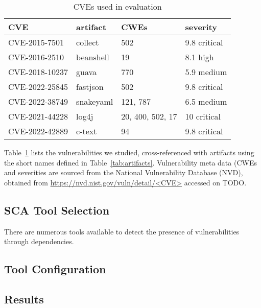 \begin{table}
	\begin{tabular}{|p{3cm}p{2cm}p{2.4cm}p{2.2cm}|}
		\hline
		CVE & artifact & CWEs  & severity  \\ 
		\hline
		CVE-2015-7501 & collect &  502  &  9.8 critical \\
		CVE-2016-2510 & beanshell & 19 & 8.1 high \\ 
		CVE-2018-10237  & guava & 770 & 5.9 medium  \\
	    CVE-2022-25845 & fastjson  & 502  & 9.8  critical \\
		CVE-2022-38749 & snakeyaml & 121, 787  &  6.5 medium \\
		CVE-2021-44228 & log4j & 20, 400, 502, 17 & 10  critical \\
		CVE-2022-42889 & c-text & 94 & 9.8 critical \\ 
		\hline
		
		\hline
	\end{tabular}
	\caption{\label{tab:cves}CVEs used in evaluation}
\end{table}




Table~\ref{tab:cves} lists the vulnerabilities we studied, cross-referenced with artifacts using the short names defined in Table~\ref{tab:artifacts}. Vulnerability meta data (CWEs and severities are sourced from the National Vulnerability Database (NVD), obtained from \url{https://nvd.nist.gov/vuln/detail/<CVE>} accessed on TODO.


\subsection{SCA Tool Selection}


There are numerous tools available to detect the presence of vulnerabilities through dependencies. 



\subsection{Tool Configuration}


\subsection{Results}